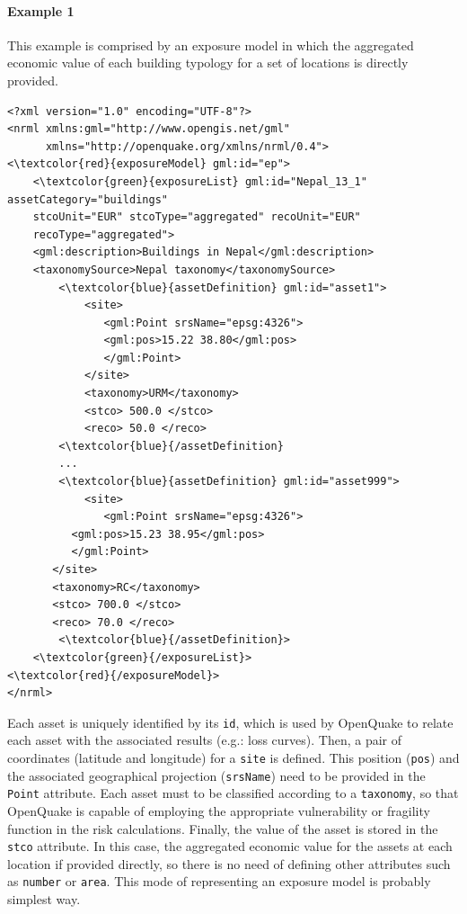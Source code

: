 \paragraph{Example 1}
This example is comprised by an exposure model in which the aggregated economic value of each building typology for a set of locations is directly provided.

\begin{Verbatim}[frame=single, commandchars=\\\{\}, samepage=false]
<?xml version="1.0" encoding="UTF-8"?>
<nrml xmlns:gml="http://www.opengis.net/gml"
      xmlns="http://openquake.org/xmlns/nrml/0.4">
<\textcolor{red}{exposureModel} gml:id="ep">
    <\textcolor{green}{exposureList} gml:id="Nepal_13_1" assetCategory="buildings" 
    stcoUnit="EUR" stcoType="aggregated" recoUnit="EUR" 
    recoType="aggregated">
    <gml:description>Buildings in Nepal</gml:description>
    <taxonomySource>Nepal taxonomy</taxonomySource>
        <\textcolor{blue}{assetDefinition} gml:id="asset1">
            <site>
               <gml:Point srsName="epsg:4326">
               <gml:pos>15.22 38.80</gml:pos>
               </gml:Point>
            </site>
            <taxonomy>URM</taxonomy>
            <stco> 500.0 </stco>
            <reco> 50.0 </reco>
        <\textcolor{blue}{/assetDefinition} 
        ...
        <\textcolor{blue}{assetDefinition} gml:id="asset999">
            <site>
               <gml:Point srsName="epsg:4326">
	      <gml:pos>15.23 38.95</gml:pos>
	      </gml:Point>
	   </site>
	   <taxonomy>RC</taxonomy>
	   <stco> 700.0 </stco>
	   <reco> 70.0 </reco>
        <\textcolor{blue}{/assetDefinition}> 
    <\textcolor{green}{/exposureList}>
<\textcolor{red}{/exposureModel}>
</nrml>
\end{Verbatim}

Each asset is uniquely identified by its \Verb+id+, which is used by OpenQuake to relate each asset with the associated results (e.g.: loss curves). Then, a pair of coordinates (latitude and longitude) for a \Verb+site+ is defined. This position (\Verb+pos+) and the associated geographical projection (\Verb+srsName+) need to be provided in the \Verb+Point+ attribute. Each asset must to be classified according to a \Verb+taxonomy+, so that OpenQuake is capable of employing the appropriate vulnerability or fragility function in the risk calculations. Finally, the value of the asset is stored in the \Verb+stco+ attribute. In this case, the aggregated economic value for the assets at each location if provided directly, so there is no need of defining other attributes such as \Verb+number+ or \Verb+area+. This mode of representing an exposure model is probably simplest way.\\ 

